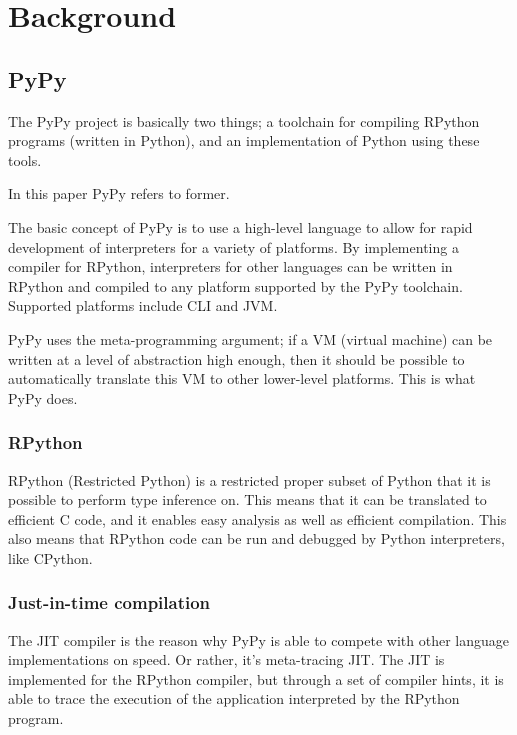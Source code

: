
\section{Background}

\subsection{PyPy}

The PyPy project is basically two things;
a toolchain for compiling RPython programs (written in Python), and 
an implementation of Python using these tools.

In this paper PyPy refers to former.

The basic concept of PyPy is to use a high-level language to allow for rapid
development of interpreters for a variety of platforms. By implementing a compiler
for RPython, interpreters for other languages can be written in RPython and 
compiled to any platform supported by the PyPy toolchain. Supported platforms include
CLI and JVM. \cite{ancona2007rpython}

PyPy uses the meta-programming argument; if a VM (virtual machine) can be written
at a level of abstraction high enough, then it should be possible to automatically translate 
this VM to other lower-level platforms. This is what PyPy does. \cite{pypy}

\subsubsection{RPython}

RPython (Restricted Python) is a restricted proper subset of Python that it 
is possible to perform type inference on. This means that it can be 
translated to efficient C code, and it enables easy analysis 
as well as efficient compilation. This also means that RPython code can be
run and debugged by Python interpreters, like CPython. \cite{ancona2007rpython}

\subsubsection{Just-in-time compilation}

The JIT compiler is the reason why PyPy is able to compete with other language implementations
on speed. Or rather, it's meta-tracing JIT. The JIT is implemented
for the RPython compiler, but through a set of compiler hints, it is able to trace the 
execution of the application interpreted by the RPython program.

